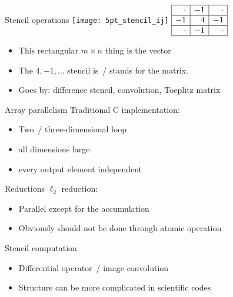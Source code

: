 \documentclass[10pt]{beamer}
\begin{document}
\begin{frame}[containsverbatim]{Stencil operations}
  \vbox{\leavevmode
    \hbox{\texttt{[image: 5pt\_stencil\_ij]}}
    \hfill 
    \(
    \begin{array}{|r|r|r|}
      \hline
      \cdot&-1&\cdot\\
      \hline
      -1&4&-1\\
      \hline
      \cdot&-1&\cdot\\
      \hline
    \end{array}
    \)
    \hfill 
    }
  \begin{itemize}
  \item This rectangular $m\times n$ thing is the vector
  \item The $4,-1,\ldots$ stencil is~/ stands for the matrix.
  \item Goes by: difference stencil, convolution, Toeplitz matrix
  \end{itemize}
\end{frame}

\begin{frame}[containsverbatim]{Array parallelism}
  Traditional C implementation:
  
  \begin{itemize}
  \item Two~/ three-dimensional loop
  \item all dimensions large
  \item every output element independent
  \end{itemize}
\end{frame}

\begin{frame}[containsverbatim]{Reductions}
  $\ell_2$ reduction:%
  \begin{itemize}
  \item Parallel except for the accumulation
  \item Obviously should not be done through atomic operation
  \end{itemize}
\end{frame}

\begin{frame}[containsverbatim]{Stencil computation}
  \begin{itemize}
  \item Differential operator~/ image convolution
  \item Structure can be more complicated in scientific codes
  \end{itemize}
\end{frame}
\end{document}
